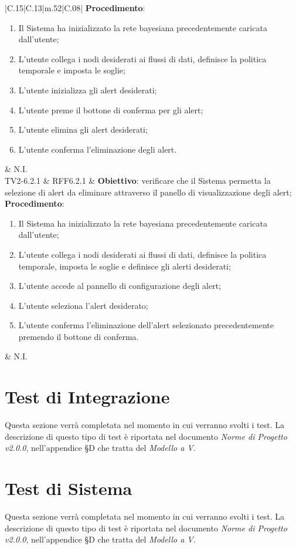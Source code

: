 \begin{longtable}{|C{.15\textwidth}|C{.13\textwidth}|m{.52\textwidth}|C{.08\textwidth}|}
	\textbf{Procedimento}:
	\begin{enumerate}
		\item Il Sistema ha inizializzato la rete bayesiana precedentemente caricata dall'utente;
		\item L'utente collega i nodi desiderati ai flussi di dati, definisce la politica temporale e imposta le soglie;
		\item L'utente inizializza gli alert desiderati;
		\item L'utente preme il bottone di conferma per gli alert;
		\item L'utente elimina gli alert desiderati;
		\item L'utente conferma l'eliminazione degli alert.
	\end{enumerate}
	& N.I. \\
\hline
	 TV2-6.2.1 & RFF6.2.1 &
	\textbf{Obiettivo}: verificare che il Sistema permetta la selezione di alert da eliminare attraverso il panello di visualizzazione degli alert;
	\textbf{Procedimento}:
	\begin{enumerate}
		\item Il Sistema ha inizializzato la rete bayesiana precedentemente caricata dall'utente;
		\item L'utente collega i nodi desiderati ai flussi di dati, definisce la politica temporale, imposta le soglie e definisce gli alerti desiderati;
		\item L'utente accede al pannello di configurazione degli alert;
		\item L'utente seleziona l'alert desiderato;
		\item L'utente conferma l'eliminazione dell'alert selezionato precedentemente premendo il bottone di conferma.
	\end{enumerate}
	& N.I. \\
\hline
\caption{Test di validazione previsti}
\label{testvalidazioneprevisti}
\end{longtable}




\newpage
\section{Test di Integrazione}
\label{test_i}
Questa sezione verrà completata nel momento in cui verranno svolti i test. La descrizione di questo tipo di test è riportata nel documento \textit{Norme di Progetto v2.0.0}, nell'appendice §D che tratta del \textit{Modello a V}.

\newpage
\section{Test di Sistema}
\label{test_s}
Questa sezione verrà completata nel momento in cui verranno svolti i test. La descrizione di questo tipo di test è riportata nel documento \textit{Norme di Progetto v2.0.0}, nell'appendice §D che tratta del \textit{Modello a V}.
\newpage
